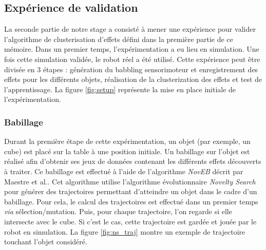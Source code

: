 \documentclass{llncs}
\newcommand*\circled[1]{\tikz[baseline=(char.base)]{
            \node[shape=circle,draw,inner sep=2pt] (char) {#1};}}
\begin{document}
\subsection{Expérience de validation}
La seconde partie de notre stage a consisté à mener une expérience pour valider l'algorithme de clusterisation d'effets défini dans la première partie de ce mémoire. Dans un premier temps, l'expérimentation a eu lieu en simulation. Une fois cette simulation validée, le robot réel a été utilisé. Cette expérience peut être divisée en 3 étapes : \circled{1} génération du babbling sensorimoteur et enregistrement des effets pour les différents objets, \circled{2} réalisation de la clusterization des effets et \circled{3} test de l'apprentissage.  La figure \ref{fig:setup} représente la mise en place initiale de l'expérimentation.

\subsubsection{Babillage}
Durant la première étape de cette expérimentation, un objet (par exemple, un cube) est placé sur la table à une position initiale. Un babillage sur l'objet est réalisé afin d'obtenir ses jeux de données contenant les différents effets découverts à traiter. Ce babillage est effectué à l'aide de l'algorithme \textit{NovEB} décrit par Maestre et al.\cite{Maestre2015}. Cet algorithme utilise l'algorithme évolutionnaire \textit{Novelty Search}\cite{5949955} pour générer des trajectoires permettant d'atteindre un objet dans le cadre d'un babillage. Pour cela, le calcul des trajectoires est effectué dans un premier temps \textit{via} sélection/mutation. Puis, pour chaque trajectoire, l'on regarde si elle intersecte avec le cube. Si c'est le cas, cette trajectoire est gardée et jouée par le robot en simulation. La figure \ref{fig:ns_traj} montre un exemple de trajectoire touchant l'objet considéré.
\end{document}

